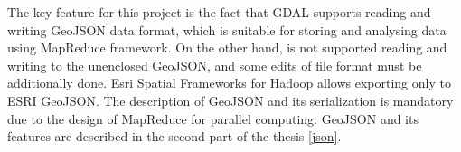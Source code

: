 \documentclass[a4paper,12pt,oneside]{report}
\begin{document}
	The key feature for this project is the fact that GDAL supports reading and writing GeoJSON data
	format, which is suitable for storing and analysing data using MapReduce framework. On the other hand, is not supported reading and writing to the unenclosed GeoJSON, and some edits of file format must be additionally done. 
	Esri Spatial Frameworks for Hadoop allows exporting only to ESRI GeoJSON. The description of
	GeoJSON and its serialization is mandatory due to the design of MapReduce 
	for parallel computing. GeoJSON and its features are described in the second
	part of the thesis \ref{json}.
	
	
	
	
	
	
\end{document}
